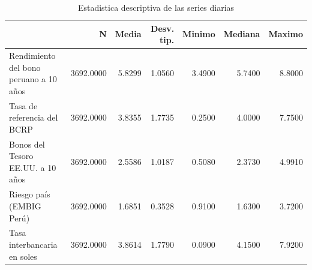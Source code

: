 \begin{table}
\caption{Estadistica descriptiva de las series diarias}
\label{tab:tabla1_descriptiva}
\begin{tabular}{lrrrrrr}
\toprule
 & N & Media & Desv. tip. & Minimo & Mediana & Maximo \\
\midrule
Rendimiento del bono peruano a 10 años & 3692.0000 & 5.8299 & 1.0560 & 3.4900 & 5.7400 & 8.8000 \\
Tasa de referencia del BCRP & 3692.0000 & 3.8355 & 1.7735 & 0.2500 & 4.0000 & 7.7500 \\
Bonos del Tesoro EE.UU. a 10 años & 3692.0000 & 2.5586 & 1.0187 & 0.5080 & 2.3730 & 4.9910 \\
Riesgo país (EMBIG Perú) & 3692.0000 & 1.6851 & 0.3528 & 0.9100 & 1.6300 & 3.7200 \\
Tasa interbancaria en soles & 3692.0000 & 3.8614 & 1.7790 & 0.0900 & 4.1500 & 7.9200 \\
\bottomrule
\end{tabular}
\end{table}
